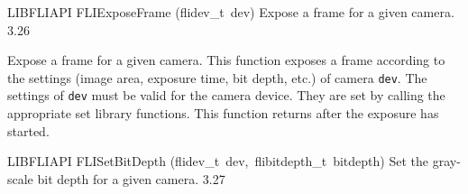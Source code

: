 \documentclass{article}
\begin{document}
\begin{cxxentry}
\begin{cxxfunction}
\begin{cxxdoc}
\end{cxxdoc}
\end{cxxfunction}
\begin{cxxfunction}
{LIBFLIAPI}
        {FLIExposeFrame}
        {(flidev\_t\ dev)}
        { Expose a frame for a given camera.}
        {3.26}
\begin{cxxdoc}

Expose a frame for a given camera.  This function exposes a frame
according to the settings (image area, exposure time, bit depth,
etc.) of camera \texttt{dev}.  The settings of \texttt{dev} must be
valid for the camera device.  They are set by calling the
appropriate set library functions.  This function returns after the
exposure has started.


\end{cxxdoc}
\end{cxxfunction}
\begin{cxxfunction}
{LIBFLIAPI}
        {FLISetBitDepth}
        {(flidev\_t\ dev,\ flibitdepth\_t\ bitdepth)}
        { Set the gray-scale bit depth for a given camera.}
        {3.27}
\begin{cxxdoc}


\end{cxxdoc}
\end{cxxfunction}
\end{cxxentry}
\end{document}
